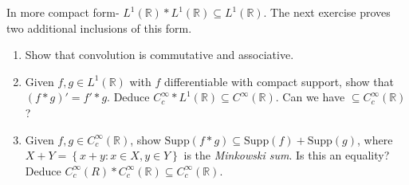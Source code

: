 \documentclass[12pt, draft,reqno,a4paper, twoside]{amsproc}
\newcommand{\supp}{\mathrm{Supp}}
\newcommand{\dbR}{\mathbb R}
\newcommand{\set}[1]{\left\{{#1}\right\}}
\begin{document}
In more compact form- $L^1(\dbR)\ast L^1(\dbR)\subseteq L^1(\dbR)$. The next exercise proves two additional inclusions of this form.
\begin{exer}\label{exer:conv-properties}
\begin{enumerate}
\item Show that convolution is commutative and associative.
\item Given $f,g\in L^1(\dbR)$ with $f$ differentiable with compact support, show that $(f\ast g)'=f'\ast g$. Deduce $C^\infty_c\ast L^1(\dbR)\subseteq C^\infty (\dbR)$. Can we have $\subseteq C_c^\infty(\dbR)$?
\item Given $f,g\in C_c^\infty(\dbR)$, show $\supp(f\ast g)\subseteq \supp(f)+\supp(g)$, where $X+Y=\set{x+y:x\in X,y\in Y}$ is the \emph{Minkowski sum}. Is this an equality? Deduce $C_c^\infty(R)\ast C_c^\infty(\dbR)\subseteq C_c^\infty(\dbR)$. 
\end{enumerate}
\end{exer}
\end{document}

